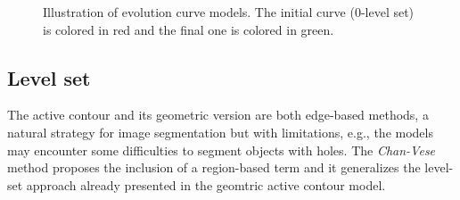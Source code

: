 \begin{figure}
\center
{}\hspace{2em}%
\hspace{2em}%
%
\caption{Illustration of evolution curve models. The initial curve ($0$-level set) is colored in red and the final one is colored in green.}
\label{ch1:fig:comparison-curve-evolution}
\end{figure}


\subsection{Level set}
	The active contour and its geometric version are both edge-based methods, a natural strategy for image segmentation but with limitations, e.g., the models may encounter some difficulties to segment objects with holes. The \emph{Chan-Vese} method proposes the inclusion of a region-based term and it generalizes the level-set approach already presented in the geomtric active contour model. 
	
